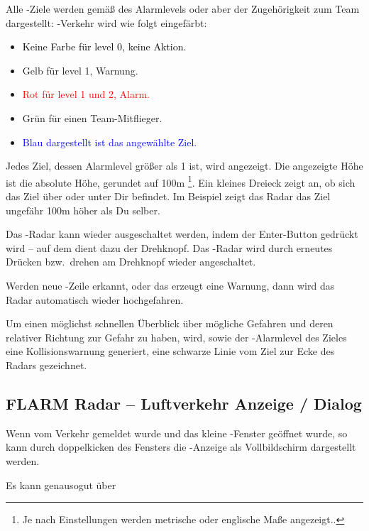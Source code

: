 Alle \fl-Ziele werden gemäß des Alarmlevels  oder aber der Zugehörigkeit zum Team dargestellt:
\fl-Verkehr wird wie folgt eingefärbt:
\begin{itemize}
\item \textcolor{black} {Keine Farbe für level 0, keine Aktion.}
\item \textcolor{warning} { Gelb für level 1, Warnung.}
\item \textcolor{red} {Rot für level 1 und 2, Alarm.}
\item \textcolor{teammate} {Grün für einen Team-Mitflieger.}
\item \textcolor{blue} {Blau dargestellt ist das angewählte Ziel.}
\end{itemize}


Jedes Ziel, dessen Alarmlevel größer als 1 ist, wird angezeigt.
Die angezeigte Höhe ist die absolute Höhe, gerundet auf 100m
\footnote{Je nach Einstellungen werden metrische oder englische Maße angezeigt..}.
Ein kleines Dreieck zeigt an, ob sich das Ziel über oder unter Dir befindet.
Im Beispiel zeigt das Radar das Ziel ungefähr 100m höher als Du selber.


Das \fl-Radar kann wieder ausgeschaltet werden, indem der Enter-Button gedrückt
wird -- auf dem \al  dient dazu der Drehknopf. Das \fl-Radar wird durch erneutes
Drücken bzw.\ drehen am Drehknopf wieder angeschaltet.

Werden neue \fl-Zeile erkannt, oder das \fl erzeugt eine Warnung, dann wird das
Radar automatisch wieder hochgefahren.

Um einen möglichst schnellen Überblick über mögliche Gefahren und deren
relativer Richtung zur Gefahr zu haben, wird, sowie der \fl-Alarmlevel des Zieles
eine Kollisionswarnung generiert, eine schwarze Linie vom Ziel zur Ecke des
Radars gezeichnet.


\subsection*{FLARM Radar -- Luftverkehr Anzeige / Dialog}
Wenn vom \fl Verkehr gemeldet wurde und das kleine \fl-Fenster geöffnet wurde,  so
kann durch doppelkicken des Fensters die \fl-Anzeige als Vollbildschirm dargestellt werden.

Es kann genausogut über

\begin{quote}
\blink{}
\end{quote}

